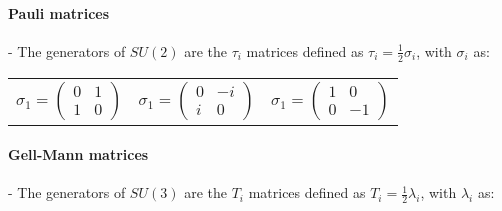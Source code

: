 \paragraph{Pauli matrices} - The generators of $SU(2)$ are the $\tau_i$ matrices defined as $\tau_i = \frac{1}{2}\sigma_i$, with $\sigma_i$ as:

\begin{table}[h]
    \centering
    \begin{tabular}{c c c}
        $\sigma_{1} = \begin{pmatrix} 0 & 1 \\ 1 & 0 \end{pmatrix}$ &  $\sigma_{1} = \begin{pmatrix} 0 & -i \\ i & 0 \end{pmatrix}$ & $\sigma_{1} = \begin{pmatrix} 1 & 0 \\ 0 & -1 \end{pmatrix}$
    \end{tabular}
\end{table}

\paragraph{Gell-Mann matrices} - The generators of $SU(3)$ are the $T_i$ matrices defined as $T_i = \frac{1}{2}\lambda_i$, with $\lambda_i$ as:

